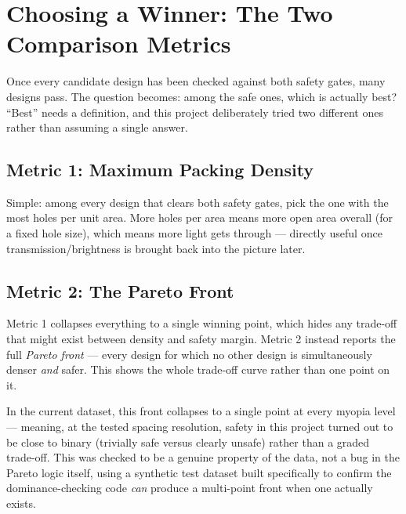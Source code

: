 \section{Choosing a Winner: The Two Comparison Metrics}

Once every candidate design has been checked against both safety gates,
many designs pass. The question becomes: among the safe ones, which is
actually best? ``Best'' needs a definition, and this project deliberately
tried two different ones rather than assuming a single answer.

\subsection{Metric 1: Maximum Packing Density}

Simple: among every design that clears both safety gates, pick the one
with the most holes per unit area. More holes per area means more open
area overall (for a fixed hole size), which means more light gets through
--- directly useful once transmission/brightness is brought back into the
picture later.

\subsection{Metric 2: The Pareto Front}

Metric 1 collapses everything to a single winning point, which hides any
trade-off that might exist between density and safety margin. Metric 2
instead reports the full \emph{Pareto front} --- every design for which no
other design is simultaneously denser \emph{and} safer. This shows the
whole trade-off curve rather than one point on it.

In the current dataset, this front collapses to a single point at every
myopia level --- meaning, at the tested spacing resolution, safety in this
project turned out to be close to binary (trivially safe versus clearly
unsafe) rather than a graded trade-off. This was checked to be a genuine
property of the data, not a bug in the Pareto logic itself, using a
synthetic test dataset built specifically to confirm the dominance-checking
code \emph{can} produce a multi-point front when one actually exists.

